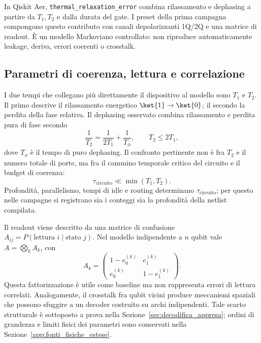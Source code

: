 \begin{onehalfspace}
In Qiskit Aer, \texttt{thermal\_relaxation\_error} combina rilassamento e
dephasing a partire da $T_1,T_2$ e dalla durata del gate. I preset della prima
campagna compongono questo contributo con canali depolarizzanti 1Q/2Q e una
matrice di readout. È un modello Markoviano controllato: non riproduce
automaticamente leakage, deriva, errori coerenti o crosstalk.

\subsection{Parametri di coerenza, lettura e correlazione}

I due tempi che collegano più direttamente il dispositivo al modello sono
$T_1$ e $T_2$. Il primo descrive il rilassamento energetico
$\ket{1}\rightarrow\ket{0}$; il secondo la perdita della fase relativa. Il
dephasing osservato combina rilassamento e perdita pura di fase secondo
\begin{equation}
    \frac{1}{T_2}=\frac{1}{2T_1}+\frac{1}{T_\phi},
    \qquad T_2\leq 2T_1,
    \label{eq:T2_operativo}
\end{equation}
dove $T_\phi$ è il tempo di puro dephasing. Il confronto pertinente non è fra
$T_2$ e il numero totale di porte, ma fra il cammino temporale critico del
circuito e il budget di coerenza:
\begin{equation}
    \tau_{\mathrm{circuito}}\ll\min(T_1,T_2).
    \label{eq:budget_coerenza}
\end{equation}
Profondità, parallelismo, tempi di idle e routing determinano
$\tau_{\mathrm{circuito}}$; per questo nelle campagne si registrano sia i
conteggi sia la profondità della netlist compilata.

Il readout viene descritto da una matrice di confusione
$A_{ij}=P(\text{lettura }i\mid\text{stato }j)$. Nel modello indipendente a
$n$ qubit vale $A=\bigotimes_k A_k$, con
\begin{equation}
    A_k=\begin{pmatrix}
    1-e_0^{(k)} & e_1^{(k)}\\
    e_0^{(k)} & 1-e_1^{(k)}
    \end{pmatrix}.
    \label{eq:matrice_readout}
\end{equation}
Questa fattorizzazione è utile come baseline ma non rappresenta errori di
lettura correlati. Analogamente, il crosstalk fra qubit vicini produce
meccanismi spaziali che possono sfuggire a un decoder costruito su archi
indipendenti. Tale scarto strutturale è sottoposto a prova nella
Sezione~\ref{sec:decodifica_appresa}; ordini di grandezza e limiti fisici dei
parametri sono conservati nella Sezione~\ref{app:fonti_fisiche_estese}.


\end{onehalfspace}
